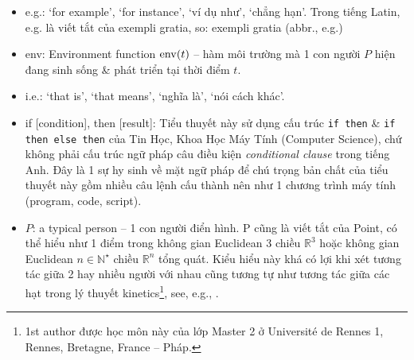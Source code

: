 \documentclass[12pt,oneside]{book}
\begin{document}
\begin{itemize}
	Hàm ĐM này cũng có thể tác động lên các biến số khác không phải biến người, e.g., ĐM nghề nghiệp (Fuck my career), ĐM cuộc đời (Fuck my life or Fuck this whole Life). Nên nghĩ thoáng trong việc sử dụng hàm này, thậm chí có thể xem nó là 1 toán tử, i.e., hàm của hàm, e.g., $P_1$ chửi ĐM lên cái hành động $P_2$ chửi ĐM $P_3$ với lý do có thể là $P_1$ \& $P_3$ là 2 cô bạn thân hoặc chị em kết nghĩa nhưng $P_3$ giật bồ{\tt/}chồng dê già của bà thím $P_2$ siêu hung dữ nên bị $P_2$ chửi sấp mặt lợn (abbr., sml) \& bị đánh ghen như trong cảnh đầu phim {\it Cánh Đồng Bất Tận}, xong $P_1$ với vai trò là bạn chí cốt của $P_3$, thấy bạn bè bị trét ớt vô vùng kín rồi chế keo dán sắt 502 để dán 2 mép lại (đến mức Dạ Hương cũng chịu thua, không đỡ nổi) mà \st{lồn} âm vật đau như cắt, nước mắt đầm đìa, bèn đứng ra chửi $P_2$ phụ $P_1$ bạn mình. Các mối quan hệ trong cuộc sống thường rối rắm, lung tung ben như thế. Bài học ở đây là phải sử dụng hàm hoặc toán tử ĐM 1 cách hợp lý (reasonably), chính xác (accurately, precisely), \& cực kỳ logic (logically) trong bất kỳ trường hợp nào trong cuộc sống thì mới có khả năng thấu hiểu Đạo trong cuộc sống được.
	\item e.g.: `for example', `for instance', `ví dụ như', `chẳng hạn'. Trong tiếng Latin, e.g. là viết tắt của exempli gratia, so: exempli gratia (abbr., e.g.)
	\item env: Environment function ${\rm env}(t)$ -- hàm môi trường mà 1 con người $P$ hiện đang sinh sống \& phát triển tại thời điểm $t$.
	\item i.e.: `that is', `that means', `nghĩa là', `nói cách khác'.
	\item if [{\sf condition}], then [{\sf result}]: Tiểu thuyết này sử dụng cấu trúc {\tt if then} \& {\tt if then else then} của Tin Học, Khoa Học Máy Tính (Computer Science), chứ không phải cấu trúc ngữ pháp câu điều kiện {\it conditional clause} trong tiếng Anh. Đây là 1 sự hy sinh về mặt ngữ pháp để chú trọng bản chất của tiểu thuyết này gồm nhiều câu lệnh cấu thành nên như 1 chương trình máy tính (program, code, script).
	\item $P$: a typical person -- 1 con người điển hình. P cũng là viết tắt của Point, có thể hiểu như 1 điểm trong không gian Euclidean 3 chiều $\mathbb{R}^3$ hoặc không gian Euclidean $n\in\mathbb{N}^\star$ chiều $\mathbb{R}^n$ tổng quát. Kiểu hiểu này khá có lợi khi xét tương tác giữa 2 hay nhiều người với nhau cũng tương tự như tương tác giữa các hạt trong lý thuyết kinetics\footnote{1st author được học môn này của lớp Master 2 ở Universit\'e de Rennes 1, Rennes, Bretagne, France -- Pháp.}, see, e.g., \cite{Tartar2008}.
	

\end{itemize}
\end{document}
